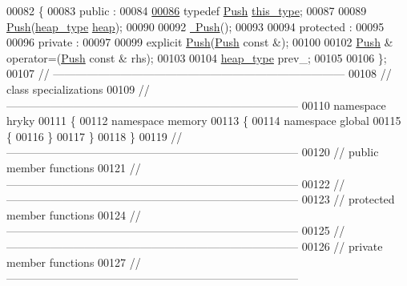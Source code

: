 \begin{DoxyCode}
00082 \{
00083 \textcolor{keyword}{public} :
00084 
\hypertarget{memory__global__common_8h_source_l00086}{}\hyperlink{classhryky_1_1memory_1_1global_1_1_push_a28ed03460bd7d9425c1ddc440a16dedb}{00086}     \textcolor{keyword}{typedef} \hyperlink{classhryky_1_1memory_1_1global_1_1_push}{Push} \hyperlink{classhryky_1_1memory_1_1global_1_1_push_a28ed03460bd7d9425c1ddc440a16dedb}{this_type};
00087 
00089     \hyperlink{classhryky_1_1memory_1_1global_1_1_push_a073b9d557fa8584bd05f3388e08e5939}{Push}(\hyperlink{classhryky_1_1memory_1_1heap_1_1_base}{heap_type} \hyperlink{namespacehryky_1_1memory_1_1global_a6fc6103f67c837aa0f39b359588409cd}{heap});
00090 
00092     \hyperlink{classhryky_1_1memory_1_1global_1_1_push_a6a4a096d7f3ff0414e2f73c9412b76aa}{~Push}();
00093 
00094 \textcolor{keyword}{protected} :
00095 
00096 \textcolor{keyword}{private} :
00097 
00099     \textcolor{keyword}{explicit} \hyperlink{classhryky_1_1memory_1_1global_1_1_push_a073b9d557fa8584bd05f3388e08e5939}{Push}(\hyperlink{classhryky_1_1memory_1_1global_1_1_push}{Push} \textcolor{keyword}{const} &);
00100 
00102     \hyperlink{classhryky_1_1memory_1_1global_1_1_push}{Push} & operator=(\hyperlink{classhryky_1_1memory_1_1global_1_1_push}{Push} \textcolor{keyword}{const} & rhs);
00103 
00104     \hyperlink{classhryky_1_1memory_1_1heap_1_1_base}{heap_type} prev\_;
00105 
00106 \};
00107 \textcolor{comment}{//
      ------------------------------------------------------------------------------}
00108 \textcolor{comment}{// class specializations}
00109 \textcolor{comment}{//
      ------------------------------------------------------------------------------}
00110 \textcolor{keyword}{namespace }hryky
00111 \{
00112 \textcolor{keyword}{namespace }memory
00113 \{
00114 \textcolor{keyword}{namespace }global
00115 \{
00116 \}
00117 \}
00118 \}
00119 \textcolor{comment}{//
      ------------------------------------------------------------------------------}
00120 \textcolor{comment}{// public member functions}
00121 \textcolor{comment}{//
      ------------------------------------------------------------------------------}
00122 \textcolor{comment}{//
      ------------------------------------------------------------------------------}
00123 \textcolor{comment}{// protected member functions}
00124 \textcolor{comment}{//
      ------------------------------------------------------------------------------}
00125 \textcolor{comment}{//
      ------------------------------------------------------------------------------}
00126 \textcolor{comment}{// private member functions}
00127 \textcolor{comment}{//
      ------------------------------------------------------------------------------}

\end{DoxyCode}
